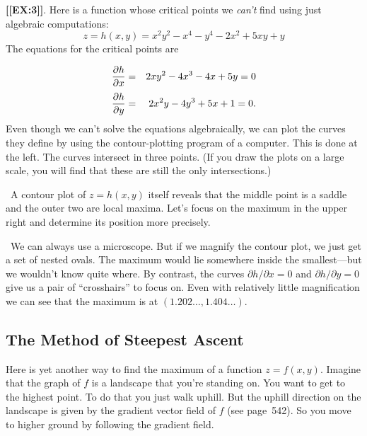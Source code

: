{{{{{\bf [[EX:3]]}.  Here is a function whose critical points we {\em can't\/} find using just algebraic computations:
        \[
z = h(x, y) = x^2 y^2 - x^4 - y^4 - 2x^2 + 5 xy + y
\]
The equations for the critical points are
\vspace{-10pt}

\hfill
\begin{eqnarray*}
        {\partial h \over \partial x} &=&  
                2 x y^2 - 4 x^3 - 4 x + 5 y = 0\\[3pt]
        {\partial h \over \partial y} &=&  
                2 x^2 y - 4 y^3 + 5 x + 1 = 0.
        \end{eqnarray*}
Even though we can't solve the equations algebraically, we can plot the curves they define by using the contour-plotting program of a computer.  This is done at the left.  The curves intersect in three points.  (If you draw the plots on a large scale, you will find that these are still the only intersections.)

\quad \ A contour plot of $z = h(x, y)$ itself reveals that the middle point is a saddle and the outer two are local maxima.  Let's focus on the maximum in the upper right and determine its position more precisely.  

\quad \ We can always use a microscope.  But if we magnify the contour plot, we just get a set of nested ovals.  The maximum would lie somewhere inside the smallest---but we wouldn't know quite where.  By contrast, the curves ${\partial h/\partial x} = 0$ and ${\partial h/\partial y} = 0$ give us a pair of ``crosshairs'' to focus on.  Even with relatively little magnification we can see that the maximum is at $(1.202\ldots, 1.404\ldots)$.


\newpage

\subsection{The Method of Steepest Ascent}

        Here is yet another way to find the maximum  
of a function $z = f(x, y)$.  Imagine that the graph of $f$ is a landscape that you're standing on.  You want to get to the highest point. To do that you just walk uphill.  But the uphill direction on the landscape is given by the gradient vector field of $f$ (see page~542).  
So you move to higher ground by following the gradient field.

}}}}
